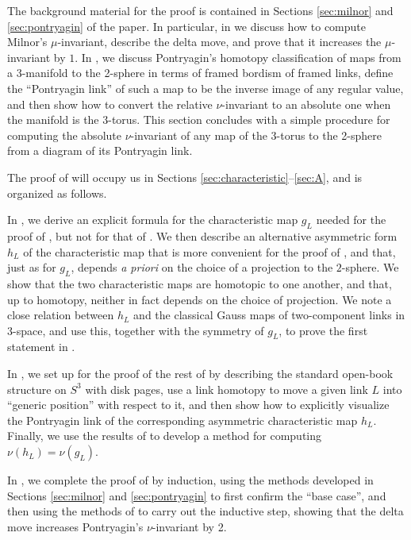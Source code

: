 
The background material for the proof is contained in Sections \ref{sec:milnor} and \ref{sec:pontryagin} of the paper.  In particular, in  we discuss how to compute Milnor's $\mu$-invariant, describe the delta move, and prove that it increases the $\mu$-invariant by $1$.  In , we discuss Pontryagin's homotopy classification of maps from a 3-manifold  to the 2-sphere in terms of framed bordism of framed links, define the ``Pontryagin link'' of such a map to be the inverse image of any regular value, and then show how to convert the relative $\nu$-invariant to an absolute one when the manifold is the $3$-torus.  This section concludes with a simple procedure for computing the absolute $\nu$-invariant of any map of the 3-torus to the 2-sphere from a diagram of its Pontryagin link. 

The proof of  will occupy us in Sections \ref{sec:characteristic}--\ref{sec:A}, and is organized as follows.  

In , we derive an explicit formula for the characteristic map $g_L$ needed for the proof of , but not for that of .  We then describe an alternative asymmetric form $h_L$ of the characteristic map that is more convenient for the proof of , and that, just as for $g_L$, depends {\it a priori} on the choice of a projection to the $2$-sphere.  We show that the two characteristic maps are homotopic to one another, and that, up to homotopy, neither in fact depends on the choice of projection.   We note a close relation between $h_L$ and the classical Gauss maps of two-component links in $3$-space, and use this, together with the symmetry of $g_L$, to prove the first statement in .  

In , we set up for the proof of the rest of  by describing the standard open-book structure on $S^3$ with disk pages, use a link homotopy to move a given link $L$ into ``generic position'' with respect to it, and then show how to explicitly visualize the Pontryagin link of the corresponding asymmetric characteristic map $h_L$.  Finally, we use the results of  to develop a method for computing $\nu(h_L) = \nu(g_L)$. 

In , we complete the proof of  by induction, using the methods developed in Sections \ref{sec:milnor} and \ref{sec:pontryagin} to first confirm the ``base case'', and then using the methods of  to carry out the inductive step, showing that the delta move increases Pontryagin's $\nu$-invariant by 2.

